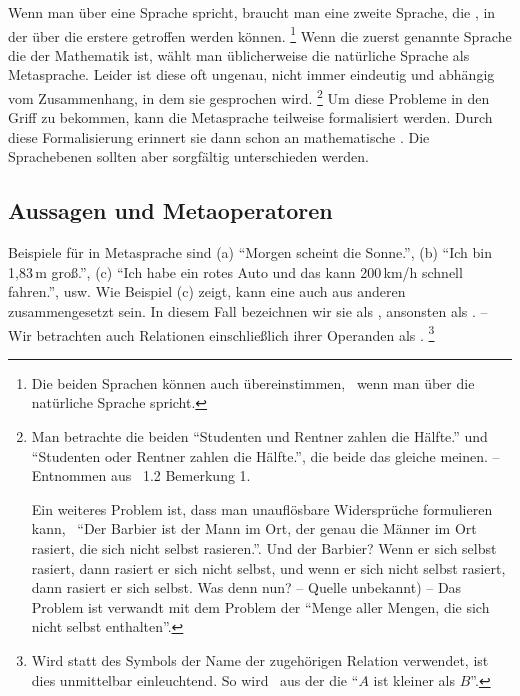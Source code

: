 Wenn man über eine Sprache spricht, braucht man eine zweite Sprache, die , in der  über die erstere getroffen werden können.%
\footnote{%
	Die beiden Sprachen können auch übereinstimmen, \textzB\ wenn man über die natürliche Sprache spricht.
}
Wenn die zuerst genannte Sprache die der Mathematik ist, wählt man üblicherweise die natürliche Sprache als Metasprache.
Leider ist diese oft ungenau, nicht immer eindeutig und abhängig vom Zusammenhang, in dem sie gesprochen wird.%
\footnote{%
	Man betrachte die beiden  \enquote{Studenten und Rentner zahlen die Hälfte.} und \enquote{Studenten oder Rentner zahlen die Hälfte.}, die beide das gleiche meinen.
	-- Entnommen aus \cite{bib:Rautenberg} \sectionname~1.2 Bemerkung 1.

	Ein weiteres Problem ist, dass man unauflösbare Widersprüche formulieren kann, \textzB\ \enquote{Der Barbier ist der Mann im Ort, der genau die Männer im Ort rasiert, die sich nicht selbst rasieren.}.
	Und der Barbier?
	Wenn er sich selbst rasiert, dann rasiert er sich nicht selbst, und wenn er sich nicht selbst rasiert, dann rasiert er sich selbst.
	Was denn nun?
	-- Quelle unbekannt) --
	Das Problem ist verwandt mit dem Problem der \enquote{Menge aller Mengen, die sich nicht selbst enthalten}.
}
Um diese Probleme in den Griff zu bekommen, kann die Metasprache teilweise formalisiert werden.
Durch diese Formalisierung erinnert sie dann schon an mathematische .
Die Sprachebenen sollten aber sorgfältig unterschieden werden.

\subsection{Aussagen und Metaoperatoren}%
\label{sub:Aussagen}

Beispiele für  in Metasprache sind
(a) \enquote{Morgen scheint die Sonne.},
(b) \enquote{Ich bin 1,83\,m groß.},
(c) \enquote{Ich habe ein rotes Auto und das kann 200\,km/h schnell fahren.}, usw.
Wie Beispiel (c) zeigt, kann eine  auch aus anderen  zusammengesetzt sein.
In diesem Fall bezeichnen wir sie als , ansonsten als .
-- Wir betrachten auch Relationen einschließlich ihrer Operanden als .%
\footnote{%
	Wird statt des Symbols der Name der zugehörigen Relation verwendet, ist dies unmittelbar einleuchtend.
	So wird \textzB\ aus der   die  \enquote{$A$ ist kleiner als $B$}.
}

